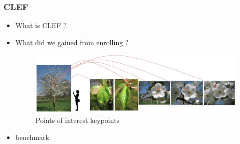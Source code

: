 \documentclass[xcolor=table]{beamer}
\begin{document}
\begin{frame} \frametitle{CLEF}
   \begin{itemize}
		\item What is CLEF ?
	    \item What did we gained from enrolling ?
		\begin{figure}[h]
			\centering
			\includegraphics[scale=0.35]{oneprunus.png}
			\caption{Points of interest keypoints}
			\label{fig:img_obsID}
		
		\end{figure}
		\item benchmark
	\end{itemize}
\end{frame}
\end{document}
